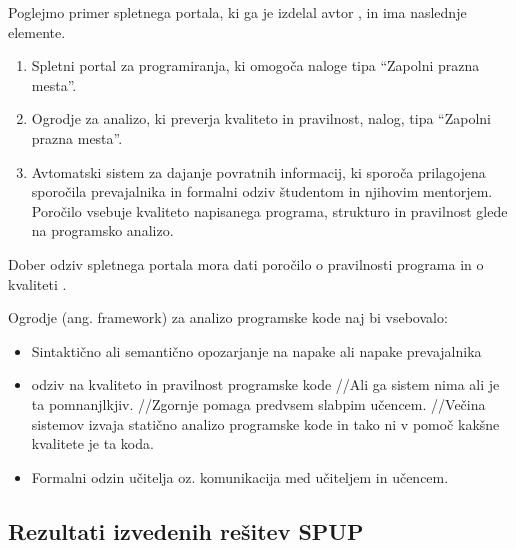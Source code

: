 Poglejmo primer spletnega portala, ki ga je izdelal avtor
\cite{thesisAWebP}, in ima naslednje elemente.

\begin{enumerate}
\tightlist
\item
  Spletni portal za programiranja, ki omogoča naloge tipa ``Zapolni
  prazna mesta''.
\item
  Ogrodje za analizo, ki preverja kvaliteto in pravilnost, nalog, tipa
  ``Zapolni prazna mesta''.
\item
  Avtomatski sistem za dajanje povratnih informacij, ki sporoča
  prilagojena sporočila prevajalnika in formalni odziv študentom in
  njihovim mentorjem. Poročilo vsebuje kvaliteto napisanega programa,
  strukturo in pravilnost glede na programsko analizo.
\end{enumerate}



Dober odziv spletnega portala mora dati poročilo o pravilnosti programa in o
kvaliteti \cite{thesisAWebP}.

Ogrodje (ang. framework) za analizo programske kode naj bi vsebovalo:

\begin{itemize}
\tightlist
\item
  Sintaktično ali semantično opozarjanje na napake ali napake
  prevajalnika
\item
  odziv na kvaliteto in pravilnost programske kode //Ali ga sistem nima
  ali je ta pomnanjlkjiv. //Zgornje pomaga predvsem slabpim učencem.
  //Večina sistemov izvaja statično analizo programske kode in tako ni v
  pomoč kakšne kvalitete je ta koda.
\item
  Formalni odzin učitelja oz. komunikacija med učiteljem in učencem.
\end{itemize}



\subsection{Rezultati izvedenih rešitev SPUP}
\label{sec:rezultati_izvedenih_rešitev}

